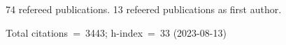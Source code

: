 74 refereed publications. 13 refeered publications as first author.

Total citations~=~3443; h-index~=~33 (2023-08-13)